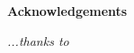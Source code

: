 \thispagestyle{empty}

\begin{center}
    {\bf \Huge Acknowledgements}
\end{center}

\vspace{4cm}

\emph{
    ...thanks to
}
